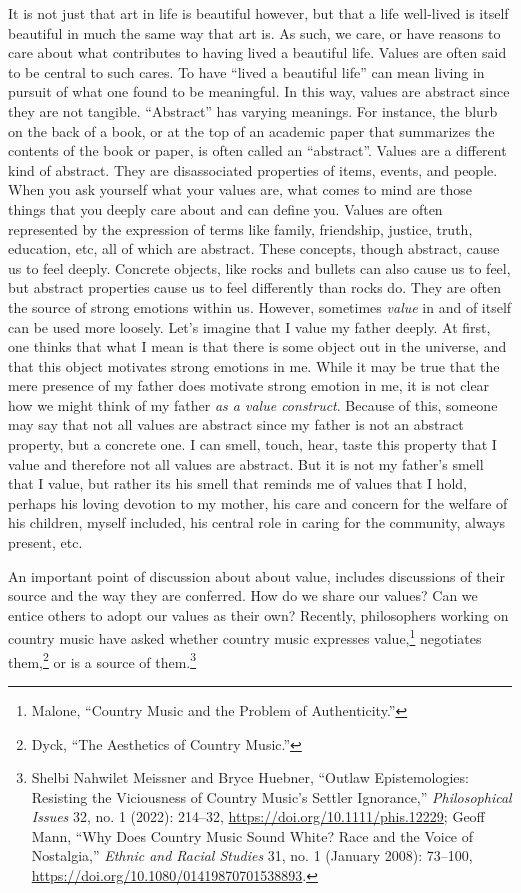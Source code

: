 \documentclass[
  12pt,
]{book}
\theoremstyle{definition}
\theoremstyle{definition}
\theoremstyle{definition}
\theoremstyle{definition}
\theoremstyle{remark}
\begin{document}
It is not just that art in life is beautiful however, but that a life well-lived is itself beautiful in much the same way that art is. As such, we care, or have reasons to care about what contributes to having lived a beautiful life. Values are often said to be central to such cares. To have ``lived a beautiful life'' can mean living in pursuit of what one found to be meaningful. In this way, values are abstract since they are not tangible. ``Abstract'' has varying meanings. For instance, the blurb on the back of a book, or at the top of an academic paper that summarizes the contents of the book or paper, is often called an ``abstract''. Values are a different kind of abstract. They are disassociated properties of items, events, and people. When you ask yourself what your values are, what comes to mind are those things that you deeply care about and can define you. Values are often represented by the expression of terms like family, friendship, justice, truth, education, etc, all of which are abstract. These concepts, though abstract, cause us to feel deeply. Concrete objects, like rocks and bullets can also cause us to feel, but abstract properties cause us to feel differently than rocks do. They are often the source of strong emotions within us. However, sometimes \emph{value} in and of itself can be used more loosely. Let's imagine that I value my father deeply. At first, one thinks that what I mean is that there is some object out in the universe, and that this object motivates strong emotions in me. While it may be true that the mere presence of my father does motivate strong emotion in me, it is not clear how we might think of my father \emph{as a value construct}. Because of this, someone may say that not all values are abstract since my father is not an abstract property, but a concrete one. I can smell, touch, hear, taste this property that I value and therefore not all values are abstract. But it is not my father's smell that I value, but rather its his smell that reminds me of values that I hold, perhaps his loving devotion to my mother, his care and concern for the welfare of his children, myself included, his central role in caring for the community, always present, etc.

An important point of discussion about about value, includes discussions of their source and the way they are conferred. How do we share our values? Can we entice others to adopt our values as their own? Recently, philosophers working on country music have asked whether country music expresses value,\footnote{Malone, {``Country {Music} and the {Problem} of {Authenticity}.''}} negotiates them,\footnote{Dyck, {``The Aesthetics of Country Music.''}} or is a source of them.\footnote{Shelbi Nahwilet Meissner and Bryce Huebner, {``Outlaw Epistemologies: {Resisting} the Viciousness of Country Music's Settler Ignorance,''} \emph{Philosophical Issues} 32, no. 1 (2022): 214--32, \url{https://doi.org/10.1111/phis.12229}; Geoff Mann, {``Why Does Country Music Sound White? {Race} and the Voice of Nostalgia,''} \emph{Ethnic and Racial Studies} 31, no. 1 (January 2008): 73--100, \url{https://doi.org/10.1080/01419870701538893}.}
\end{document}
